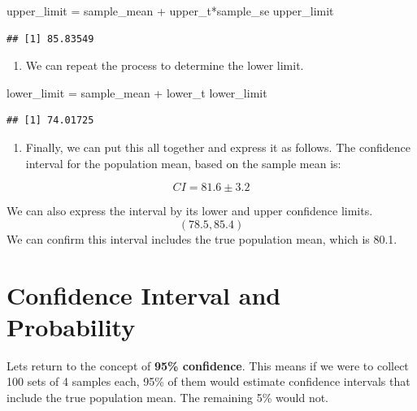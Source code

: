 \documentclass[
]{book}
\newenvironment{Shaded}{\begin{snugshade}}{\end{snugshade}}
\newcommand{\NormalTok}[1]{#1}
\newcommand{\OtherTok}[1]{\textcolor[rgb]{0.56,0.35,0.01}{#1}}
\newcommand{\SpecialCharTok}[1]{\textcolor[rgb]{0.00,0.00,0.00}{#1}}
\providecommand{\tightlist}{%
  \setlength{\itemsep}{0pt}\setlength{\parskip}{0pt}}
\begin{document}
\begin{Shaded}
\begin{Highlighting}[]
\NormalTok{upper\_limit }\OtherTok{=}\NormalTok{ sample\_mean }\SpecialCharTok{+}\NormalTok{ upper\_t}\SpecialCharTok{*}\NormalTok{sample\_se}
\NormalTok{upper\_limit}
\end{Highlighting}
\end{Shaded}

\begin{verbatim}
## [1] 85.83549
\end{verbatim}

\begin{enumerate}
\def\labelenumi{\arabic{enumi}.}
\setcounter{enumi}{7}
\tightlist
\item
  We can repeat the process to determine the lower limit.
\end{enumerate}

\begin{Shaded}
\begin{Highlighting}[]
\NormalTok{lower\_limit }\OtherTok{=}\NormalTok{ sample\_mean }\SpecialCharTok{+}\NormalTok{ lower\_t}
\NormalTok{lower\_limit}
\end{Highlighting}
\end{Shaded}

\begin{verbatim}
## [1] 74.01725
\end{verbatim}

\begin{enumerate}
\def\labelenumi{\arabic{enumi}.}
\setcounter{enumi}{8}
\tightlist
\item
  Finally, we can put this all together and express it as follows. The
  confidence interval for the population mean, based on the sample
  mean is:
\end{enumerate}

\[ CI = 81.6 \pm 3.2 \]

We can also express the interval by its lower and upper confidence
limits. \[(78.5, 85.4)\] We can confirm this interval includes the true
population mean, which is 80.1.

\hypertarget{confidence-interval-and-probability}{%
\section{Confidence Interval and Probability}\label{confidence-interval-and-probability}}

Lets return to the concept of \textbf{95\% confidence}. This means if we were
to collect 100 sets of 4 samples each, 95\% of them would estimate
confidence intervals that include the true population mean. The
remaining 5\% would not.
\end{document}
